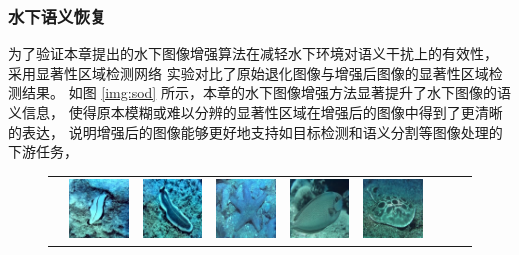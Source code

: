 \subsubsection{水下语义恢复}
为了验证本章提出的水下图像增强算法在减轻水下环境对语义干扰上的有效性，
采用显著性区域检测网络 \cite{sod} 实验对比了原始退化图像与增强后图像的显著性区域检测结果。
如图 \ref{img:sod} 所示，本章的水下图像增强方法显著提升了水下图像的语义信息，
使得原本模糊或难以分辨的显著性区域在增强后的图像中得到了更清晰的表达，
说明增强后的图像能够更好地支持如目标检测和语义分割等图像处理的下游任务，
\begin{figure}[ht]
	\begin{center}
		\begin{tabular}{ccccccccc}
            \vspace{-0.5mm}  
            \raisebox{0.8cm}{\footnotesize Input}   & \hspace{-0.36cm}
            \includegraphics[width = 0.10\linewidth, height=0.10\linewidth]{figures/ch3/compare/discussion/SOD/original/1.JPEG} & \hspace{-0.43cm} 
            \includegraphics[width = 0.10\linewidth, height=0.10\linewidth]{figures/ch3/compare/discussion/SOD/original/2.JPEG}  & \hspace{-0.43cm} 
            \includegraphics[width = 0.10\linewidth, height=0.10\linewidth]{figures/ch3/compare/discussion/SOD/original/3.jpg}  & \hspace{-0.43cm}  
            \includegraphics[width = 0.10\linewidth, height=0.10\linewidth]{figures/ch3/compare/discussion/SOD/original/4.jpg}  & \hspace{-0.43cm} 
            \includegraphics[width = 0.10\linewidth, height=0.10\linewidth]{figures/ch3/compare/discussion/SOD/original/5.JPEG}  & \hspace{-0.43cm} 

\end{tabular}
\end{center}
\end{figure}
